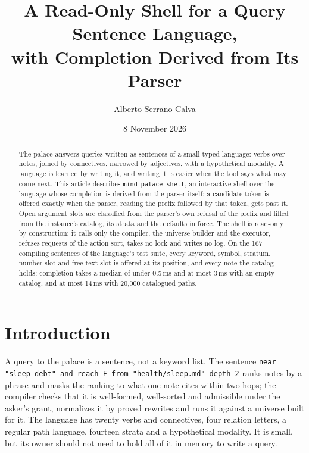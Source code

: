 \documentclass[11pt]{article}
\title{A Read-Only Shell for a Query Sentence Language,\\ with Completion Derived from Its Parser}
\author{Alberto Serrano-Calva}
\date{8 November 2026}
\theoremstyle{plain}
\theoremstyle{definition}
\theoremstyle{remark}
\newcommand{\code}[1]{\texttt{#1}}
\begin{document}
\maketitle

\begin{abstract}
The palace answers queries written as sentences of a small typed language: verbs over notes,
joined by connectives, narrowed by adjectives, with a hypothetical modality. A language is learned
by writing it, and writing it is easier when the tool says what may come next. This article
describes \code{mind-palace shell}, an interactive shell over the language whose completion is
derived from the parser itself: a candidate token is offered exactly when the parser, reading the
prefix followed by that token, gets past it. Open argument slots are classified from the parser's
own refusal of the prefix and filled from the instance's catalog, its strata and the defaults in
force. The shell is read-only by construction: it calls only the compiler, the universe builder
and the executor, refuses requests of the action sort, takes no lock and writes no log. On the 167
compiling sentences of the language's test suite, every keyword, symbol, stratum, number slot and
free-text slot is offered at its position, and every note the catalog holds; completion takes a
median of under 0.5\,ms and at most 3\,ms with an empty catalog, and at most 14\,ms with 20{,}000
catalogued paths.
\end{abstract}

\section{Introduction}
A query to the palace is a sentence, not a keyword list. The sentence
\code{near "sleep debt" and reach F from "health/sleep.md" depth 2} ranks notes by a phrase and
masks the ranking to what one note cites within two hops; the compiler checks that it is
well-formed, well-sorted and admissible under the asker's grant, normalizes it by proved
rewrites and runs it against a universe built for it. The language has twenty verbs and
connectives, four relation letters, a regular path language, fourteen strata and a hypothetical
modality. It is small, but its owner should not need to hold all of it in memory to write a query.
\end{document}
